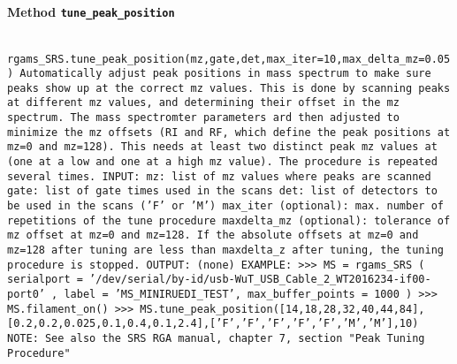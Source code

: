 \paragraph{Method \texttt{tune_peak_position}}
\vspace{1ex}
\texttt{\newline
rgams_SRS.tune_peak_position(mz,gate,det,max_iter=10,max_delta_mz=0.05)\newline
\newline
Automatically adjust peak positions in mass spectrum to make sure peaks show up at the correct mz values. This is done by scanning peaks at different mz values, and determining their offset in the mz spectrum. The mass spectromter parameters ard then adjusted to minimize the mz offsets (RI and RF, which define the peak positions at mz=0 and mz=128). This needs at least two distinct peak mz values at (one at a low and one at a high mz value). The procedure is repeated several times.\newline
\newline
INPUT:\newline
mz: list of mz values where peaks are scanned\newline
gate: list of gate times used in the scans\newline
det: list of detectors to be used in the scans ('F' or 'M')\newline
max_iter (optional): max. number of repetitions of the tune procedure\newline
maxdelta_mz (optional): tolerance of mz offset at mz=0 and mz=128. If the absolute offsets at mz=0 and mz=128 after tuning are less than maxdelta_z after tuning, the tuning procedure is stopped.\newline
\newline
OUTPUT:\newline
(none)\newline
\newline
EXAMPLE:\newline
>>> MS = rgams_SRS ( serialport = '/dev/serial/by-id/usb-WuT_USB_Cable_2_WT2016234-if00-port0' , label = 'MS_MINIRUEDI_TEST', max_buffer_points = 1000 )\newline
>>> MS.filament_on()\newline
>>> MS.tune_peak_position([14,18,28,32,40,44,84],[0.2,0.2,0.025,0.1,0.4,0.1,2.4],['F','F','F','F','F','M','M'],10)\newline
\newline
NOTE:\newline
See also the SRS RGA manual, chapter 7, section "Peak Tuning Procedure"\newline
\newline
}

